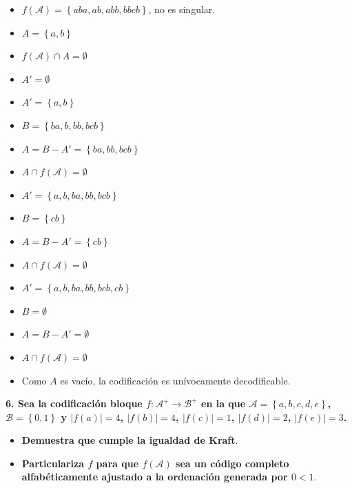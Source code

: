 \documentclass{article}
\begin{document}
\begin{itemize}
    \item $f\left(\mathcal{A}\right)=\left\{aba,ab,abb,bbcb\right\}$, no es singular.
    \item $A=\left\{a, b\right\}$
    \item $f\left(\mathcal{A}\right)\cap A = \emptyset$
    \item $A'=\emptyset$
    \item $A'=\left\{a, b\right\}$
    \item $B = \left\{ba, b, bb, bcb\right\}$
    \item $A = B-A' = \left\{ba, bb, bcb\right\}$
    \item $A\cap f\left(\mathcal{A}\right) = \emptyset$
    \item $A'=\left\{a, b, ba, bb, bcb\right\}$
    \item $B = \left\{cb\right\}$
    \item $A = B-A' = \left\{cb\right\}$
    \item $A\cap f\left(\mathcal{A}\right) = \emptyset$
    \item $A'=\left\{a, b, ba, bb, bcb, cb\right\}$
    \item $B = \emptyset$
    \item $A = B-A' = \emptyset$
    \item $A\cap f\left(\mathcal{A}\right) = \emptyset$
    \item Como $A$ es vacío, la codificación es unívocamente decodificable.
\end{itemize}

\vspace{1cm}

\textbf{
6. Sea la codificación bloque $f:\mathcal{A}^+\rightarrow\mathcal{B}^+$ en la que $\mathcal{A}=\left\{a,b,c,d,e\right\}$, $\mathcal{B}=\left\{0,1\right\}$ y $\left|f(a)\right|=4$, $\left|f(b)\right|=4$, $\left|f(c)\right|=1$, $\left|f(d)\right|=2$, $\left|f(e)\right|=3$.
}

\begin{itemize}
    \item\textbf{Demuestra que cumple la igualdad de Kraft}.
    \item\textbf{Particulariza $f$ para que $f\left(\mathcal{A}\right)$ sea un código completo alfabéticamente ajustado a la ordenación generada por $0<1$}.
\end{itemize}

\vspace{0.5cm}
\end{document}
